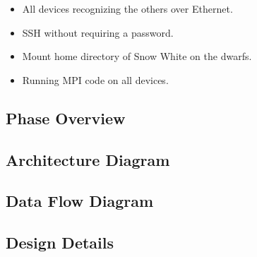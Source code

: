 \begin{itemize} 
	\item All devices recognizing the others over Ethernet.
	\item SSH without requiring a password.
	\item Mount home directory of Snow White on the dwarfs.
	\item Running MPI code on all devices.
\end{itemize}


\subsection{Phase Overview}

\subsection{ Architecture  Diagram}


\subsection{Data Flow Diagram}


\subsection{Design Details}

